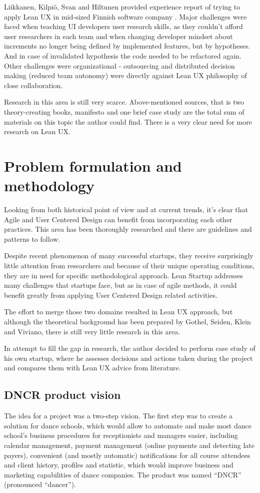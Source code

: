 \documentclass{article}
\begin{document}
Liikkanen, Kilpiö, Svan and Hiltunen provided experience report of trying to apply Lean UX in mid-sized Finnish software company \cite{liikkanen2014lean}. Major challenges were faced when teaching UI developers user research skills, as they couldn't afford user researchers in each team and when changing developer mindset about increments no longer being defined by implemented features, but by hypotheses. And in case of invalidated hypothesis the code needed to be refactored again. Other challenges were organizational - outsourcing and distributed decision making (reduced team autonomy) were directly against Lean UX philosophy of close collaboration.

Research in this area is still very scarce. Above-mentioned sources, that is two theory-creating books, manifesto and one brief case study are the total sum of materials on this topic the author could find. There is a very clear need for more research on Lean UX.

\section{Problem formulation and methodology}
\label{sec:probl-form-meth}
Looking from both historical point of view and at current trends, it's clear that Agile and User Centered Design can benefit from incorporating each other practices. This area has been thoroughly researched and there are guidelines and patterns to follow.

Despite recent phenomenon of many successful startups, they receive surprisingly little attention from researchers and because of their unique operating conditions, they are in need for specific methodological approach. Lean Startup addresses many challenges that startups face, but as in case of agile methods, it could benefit greatly from applying User Centered Design related activities.

The effort to merge those two domains resulted in Lean UX approach, but although the theoretical background has been prepared by Gothel, Seiden, Klein and Viviano, there is still very little research in this area.

In attempt to fill the gap in research, the author decided to perform case study of his own startup, where he assesses decisions and actions taken during the project and compares them with Lean UX advice from literature.

\subsection{DNCR product vision}
The idea for a project was a two-step vision. The first step was to create a solution for dance schools, which would allow to automate and make most dance school's business procedures for receptionists and managers easier, including calendar management, payment management (online payments and detecting late payers), convenient (and mostly automatic) notifications for all course attendees and client history, profiles and statistic, which would improve business and marketing capabilities of dance companies. The product was named ``DNCR'' (pronounced ``dancer'').
\end{document}
